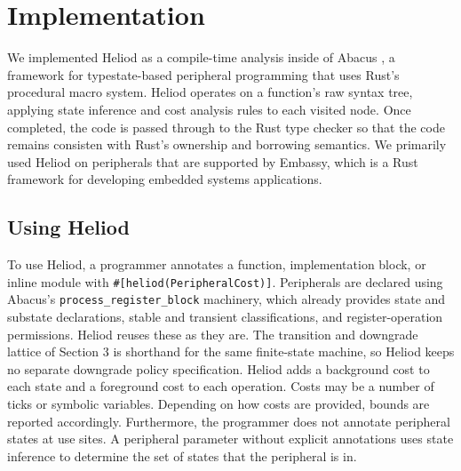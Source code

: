 \section{Implementation}
We implemented Heliod as a compile-time analysis inside of Abacus \cite{abacus}, a framework for typestate-based peripheral programming that uses Rust's procedural macro system. Heliod operates on a function's raw syntax tree, applying state inference and cost analysis rules to each visited node. Once completed, the code is passed through to the Rust type checker so that the code remains consisten with Rust's ownership and borrowing semantics. We primarily used Heliod on peripherals that are supported by Embassy, which is a Rust framework for developing embedded systems applications.

\subsection{Using Heliod}

To use Heliod, a programmer annotates a function, implementation block, or inline module with \texttt{\#[heliod(PeripheralCost)]}. Peripherals are declared using Abacus’s \texttt{process\_register\_block} machinery, which already provides state and substate declarations, stable and transient classifications, and register-operation permissions. Heliod reuses these as they are. The transition and downgrade lattice of Section 3 is shorthand for the same finite-state machine, so Heliod keeps no separate downgrade policy specification. Heliod adds a background cost to each state and a foreground cost to each operation. Costs may be a number of ticks or symbolic variables. Depending on how costs are provided, bounds are reported accordingly.  Furthermore, the programmer does not annotate peripheral states at use sites. A peripheral parameter without explicit annotations uses state inference to determine the set of states that the peripheral is in.

